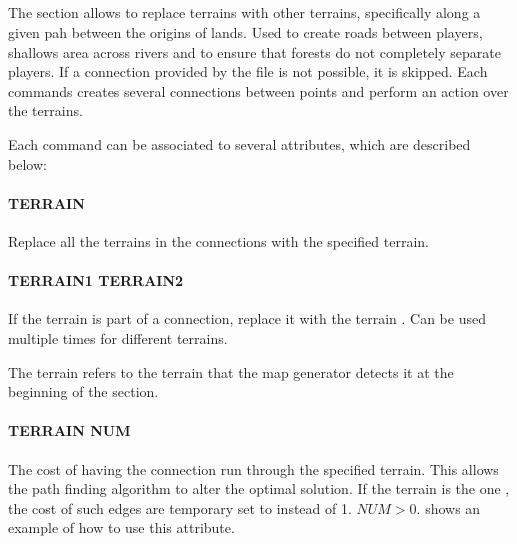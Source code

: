     \subsection{}

    The section allows to replace terrains with other terrains, specifically along a given pah between the origins of lands. Used to create roads between players, shallows area across rivers and to ensure that forests do not completely separate players. If a connection provided by the  file is not possible, it is skipped.  Each commands creates several connections between points and perform an action over the terrains.

    Each command can be associated to several attributes, which are described below:

    \paragraph{ TERRAIN}

    Replace all the terrains in the connections with the specified terrain.

    \paragraph{ TERRAIN1 TERRAIN2}

    If the terrain  is part of a connection, replace it with the terrain . Can be used multiple times for different terrains.

    \begin{attention}
        The terrain  refers to the terrain that the map generator detects it at the beginning of the  section.
    \end{attention}

    \paragraph{ TERRAIN NUM}

    The cost of having the connection run through the specified terrain. This allows the path finding algorithm \cite{dijkstra1959a} to alter the optimal solution. If the terrain is the one , the cost of such edges are temporary set to  instead of 1. $NUM > 0$.  shows an example of how to use this attribute.

